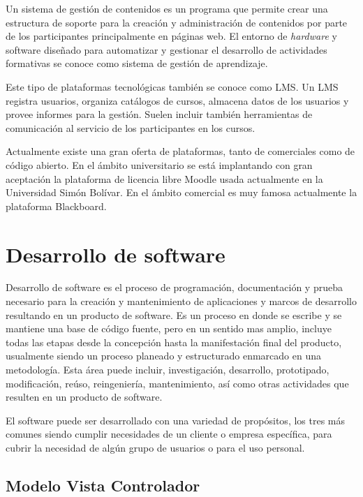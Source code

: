 Un sistema de gestión de contenidos es un programa que permite crear una estructura de soporte para la creación y administración de contenidos por parte de los participantes principalmente en páginas web. El entorno de \emph{hardware} y software diseñado para automatizar y gestionar el desarrollo de actividades formativas se conoce como sistema de gestión de aprendizaje\cite{bib:lms}. 

Este tipo de plataformas tecnológicas también se conoce como \gls{LMS}. Un \gls{LMS} registra usuarios, organiza catálogos de cursos, almacena datos de los usuarios y provee informes para la gestión. Suelen incluir también herramientas de comunicación al servicio de los participantes en los cursos. 

Actualmente existe una gran oferta de plataformas, tanto de comerciales como de código abierto. En el ámbito universitario se está implantando con gran aceptación la plataforma de licencia libre Moodle usada actualmente en la Universidad Simón Bolívar. En el ámbito comercial es muy famosa actualmente la plataforma Blackboard.

\section{Desarrollo de software}

Desarrollo de software es el proceso de programación, documentación y prueba necesario para la creación y mantenimiento de aplicaciones y marcos de desarrollo resultando en un producto de software. Es un proceso en donde se escribe y se mantiene una base de código fuente, pero en un sentido mas amplio, incluye todas las etapas desde la concepción hasta la manifestación final del producto, usualmente siendo un proceso planeado y estructurado enmarcado en una metodología. Esta área puede incluir, investigación, desarrollo, prototipado, modificación, reúso, reingeniería, mantenimiento, así como otras actividades que resulten en un producto de software.

El software puede ser desarrollado con una variedad de propósitos, los tres más comunes siendo cumplir necesidades de un cliente o empresa específica, para cubrir la necesidad de algún grupo de usuarios o para el uso personal\cite{bib:desarrolloSoftware}. 

\subsection{Modelo Vista Controlador}

